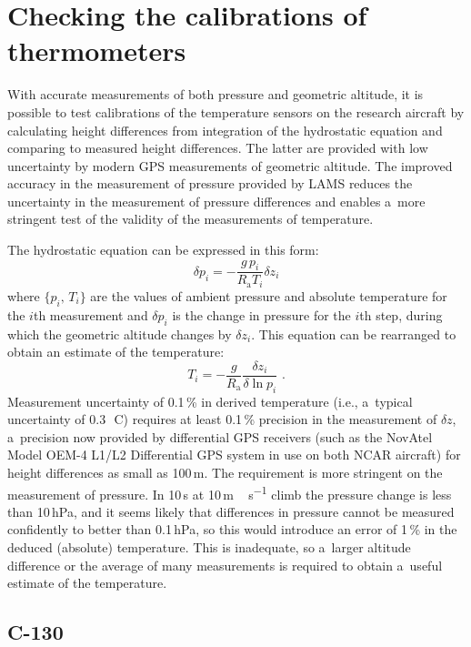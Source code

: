 \documentclass[amtd, online, hvmath]{copernicus}
\begin{document}
\section{Checking the calibrations of thermometers}

With accurate measurements of both pressure and geometric altitude, it
is possible to test calibrations of the temperature sensors on the
research aircraft by calculating height differences from integration
of the hydrostatic equation and comparing to measured height
differences.  The latter are provided with low uncertainty by modern
GPS measurements of geometric altitude. The improved accuracy in the
measurement of pressure provided by LAMS reduces the uncertainty in
the measurement of pressure differences and enables a~more stringent
test of the validity of the measurements of temperature.

The hydrostatic equation can be expressed in this form:
\begin{equation}
\delta p_i=-\frac{g\,p_i}{R_{\mathrm{a}}T_i}\delta z_i\label{eq:hydrostaticEq-1}
\end{equation}
where $\{p_i,\,T_i\}$ are the values of ambient pressure and
absolute temperature for the $i$th measurement and $\delta p_i$
is the change in pressure for the $i$th step, during which the geometric
altitude changes by $\delta z_i$. This equation can be rearranged
to obtain an estimate of the temperature:
\begin{equation}
T_i=-\frac{g}{R_{\mathrm{a}}}\frac{\delta z_i}{\delta\ln p_i}\,\,.\label{eq:Tfromdzdp-1}
\end{equation}
Measurement uncertainty of 0.1\,{\%} in derived temperature (i.e.,
a~typical uncertainty of 0.3\,\unit{{\degree}C}) requires at least
0.1\,{\%} precision in the measurement of $\delta z$, a~precision now
provided by differential GPS receivers (such as the NovAtel Model
OEM-4 L1/L2 Differential GPS system in use on both NCAR aircraft) for
height differences as small as 100\,m. The requirement is more
stringent on the measurement of pressure. In 10\,s at
10\,\unit{m\,s^{-1}} climb the pressure change is less than 10\,hPa,
and it seems likely that differences in pressure cannot be measured
confidently to better than 0.1\,hPa, so this would introduce an error
of 1\,{\%} in the deduced (absolute) temperature. This is inadequate,
so a~larger altitude difference or the average of many measurements is
required to obtain a~useful estimate of the temperature.

\subsection{C-130}
\end{document}
